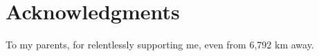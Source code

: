 \chapter*{Acknowledgments}

To my parents, for relentlessly supporting me, even from 6,792 km away.

